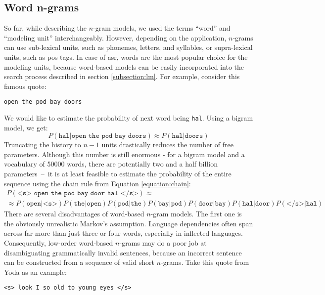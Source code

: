 	\subsection{Word n-grams}
	So far, while describing the \mbox{$n$-gram} models, we used the terms ``word'' and ``modeling unit'' interchangeably. However, depending on the application, \mbox{$n$-gram}s can use sub-lexical units, such as phonemes, letters, and syllables, or supra-lexical units, such as \gls{pos} tags. In case of \gls{asr}, words are the most popular choice for the modeling units, because word-based models can be easily incorporated into the search process described in section \ref{subsection:lm}. For example, consider this famous quote:
	\begin{center}
		\texttt{open the pod bay doors}
	\end{center}
	We would like to estimate the probability of next word being \texttt{hal}. Using a bigram model, we get:
	\begin{equation}
		P(\texttt{hal}|\texttt{open the pod bay doors}) \approx P(\texttt{hal}|\texttt{doors})
	\end{equation}
	Truncating the history to $n-1$ units drastically reduces the number of free parameters. Although this number is still enormous - for a bigram model and a vocabulary of 50000 words, there are potentially two and a half billion parameters~--~it is at least feasible to estimate the probability of the entire sequence using the chain rule from Equation \ref{equation:chain}:
	\begin{multline}
		P(\texttt{<s> open the pod bay door hal </s>}) \approx \\
		\approx P(\texttt{open}|\texttt{<s>})P(\texttt{the}|\texttt{open})P(\texttt{pod}|\texttt{the})P(\texttt{bay}|\texttt{pod})P(\texttt{door}|\texttt{bay})P(\texttt{hal}|\texttt{door})P(\texttt{</s>}|\texttt{hal})
	\end{multline}
	There are several disadvantages of word-based \mbox{$n$-gram} models. The first one is the obviously unrealistic Markov's assumption. Language dependencies often span across far more than just three or four words, especially in inflected languages. Consequently, low-order word-based \mbox{$n$-gram}s may do a poor job at disambiguating grammatically invalid sentences, because an incorrect sentence can be constructed from a sequence of valid short \mbox{$n$-gram}s. Take this quote from Yoda as an example:
	\begin{center}
		\texttt{<s> look I so old to young eyes </s>}
	\end{center}
